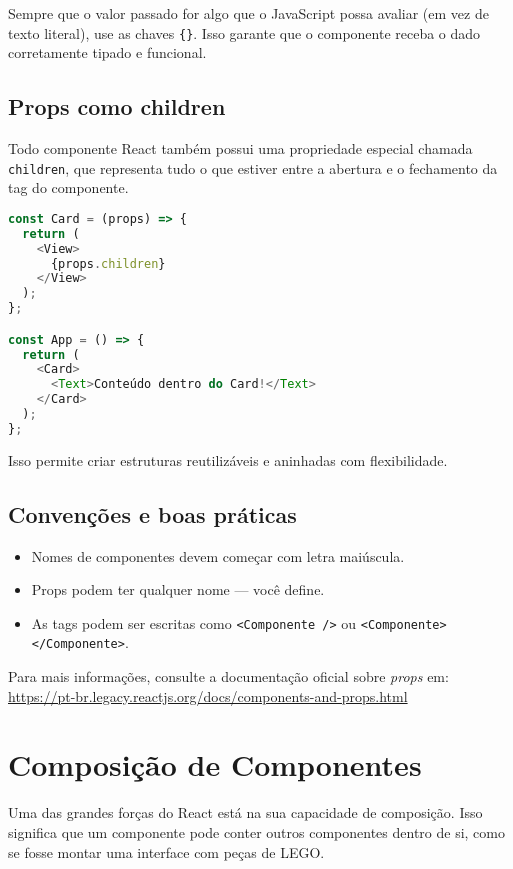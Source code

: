 Sempre que o valor passado for algo que o JavaScript possa avaliar (em vez de texto literal), use as chaves \texttt{\{\}}. Isso garante que o componente receba o dado corretamente tipado e funcional.



\subsection*{Props como children}

Todo componente React também possui uma propriedade especial chamada \texttt{children}, que representa tudo o que estiver entre a abertura e o fechamento da tag do componente.

\begin{lstlisting}[language=JavaScript, caption={Uso de props.children}]
const Card = (props) => {
  return (
    <View>
      {props.children}
    </View>
  );
};

const App = () => {
  return (
    <Card>
      <Text>Conteúdo dentro do Card!</Text>
    </Card>
  );
};
\end{lstlisting}

Isso permite criar estruturas reutilizáveis e aninhadas com flexibilidade.

\subsection*{Convenções e boas práticas}

\begin{itemize}
  \item Nomes de componentes devem começar com letra maiúscula.
  \item Props podem ter qualquer nome — você define.
  \item As tags podem ser escritas como \texttt{<Componente />} ou \texttt{<Componente></Componente>}.
\end{itemize}

Para mais informações, consulte a documentação oficial sobre \textit{props} em: \url{https://pt-br.legacy.reactjs.org/docs/components-and-props.html}

\section{Composição de Componentes}

Uma das grandes forças do React está na sua capacidade de composição. Isso significa que um componente pode conter outros componentes dentro de si, como se fosse montar uma interface com peças de LEGO.

